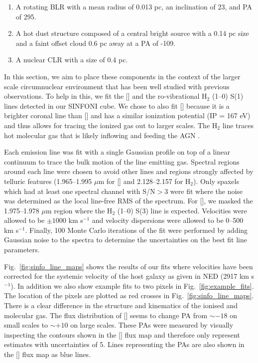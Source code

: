 \documentclass[longauth,]{aa}
\newcommand{\micron}{{\mbox{$\mu$m}}}
\newcommand{\caviii}{[\ion{Ca}{viii}]}
\newcommand{\sivi}{[\ion{Si}{vi}]}
\begin{document}
\begin{enumerate}
    \item A rotating BLR with a mean radius of 0.013 pc, an inclination of 23\degree{}, and PA of 295\degree{}.
    \item A hot dust structure composed of a central bright source with a 0.14 pc size and a faint offset cloud 0.6 pc away at a PA of -109\degree{}.
    \item A nuclear CLR with a size of 0.4 pc.
\end{enumerate}

In this section, we aim to place these components in the context of the larger scale circumnuclear environment that has been well studied with previous observations. To help in this, we fit the \sivi{} and the ro-vibrational H$_{2}$ (1--0) S(1) lines detected in our SINFONI cube. We chose to also fit \sivi{} because it is a brighter coronal line than \caviii{} and has a similar ionization potential (IP = 167 eV) and thus allows for tracing the ionized gas out to larger scales. The H$_2$ line traces hot molecular gas that is likely inflowing and feeding the AGN \citep[e.g][]{Hicks:2009aa,Hicks:2013ly,Davies:2014aa}. 

Each emission line was fit with a single Gaussian profile on top of a linear continuum to trace the bulk motion of the line emitting gas. Spectral regions around each line were chosen to avoid other lines and regions strongly affected by telluric features (1.965--1.995 \micron{} for \sivi{} and 2.128--2.157 for H$_{2}$). Only spaxels which had at least one spectral channel with S/N$>3$ were fit where the noise was determined as the local line-free RMS of the spectrum. For \sivi, we masked the 1.975--1.978 \micron{} region where the H$_{2}$ (1--0) S(3) line is expected. Velocities were allowed to be $\pm1000$ km s$^{-1}$ and velocity dispersions were allowed to be 0--500 km s$^{-1}$. Finally, 100 Monte Carlo iterations of the fit were performed by adding Gaussian noise to the spectra to determine the uncertainties on the best fit line parameters.

Fig.~\ref{fig:sinfo_line_maps} shows the results of our fits where velocities have been corrected for the systemic velocity of the host galaxy as given in NED (2917 km s$^{-1}$). In addition we also show example fits to two pixels in Fig.~\ref{fig:example_fits}. The location of the pixels are plotted as red crosses in Fig.~\ref{fig:sinfo_line_maps}. There is a clear difference in the structure and kinematics of the ionised and molecular gas. The flux distribution of \sivi{} seems to change PA from $\sim -18$\degree{} on small scales to $\sim +10$\degree{} on large scales. These PAs were measured by visually inspecting the contours shown in the \sivi{} flux map and therefore only represent estimates with uncertainties of 5\degree. Lines representing the PAs are also shown in the \sivi{} flux map as blue lines. 
\end{document}
